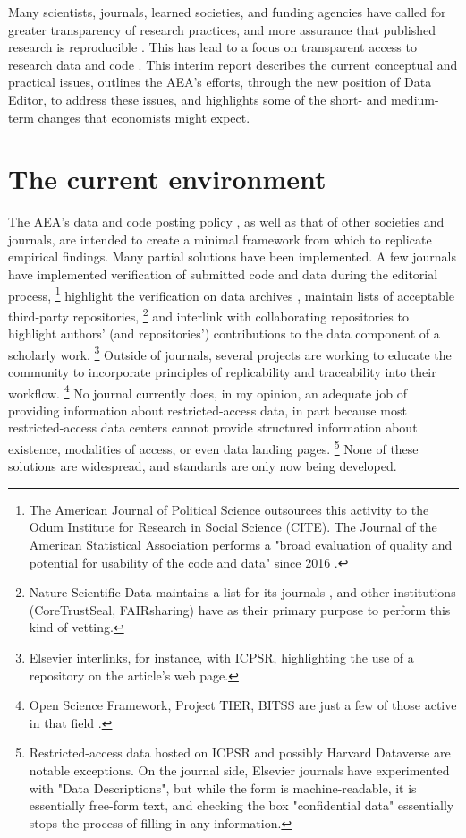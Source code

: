 \documentclass[AEJ]{AEA}
\begin{document}
Many scientists,  journals, learned societies, and funding agencies have called for greater transparency of research practices, and more assurance that published research is reproducible \citep{Stodden2016-uc,Fuentes2016-wz,Moffitt2016-wl,Camerer2016-kl,Bollen2015-vb,Joskow2015-hd}. This has lead to a focus on transparent access to research data and code \citep{Coffman2017-si,Hoeffler2017-aa,Duvendack2017-js,Hamermesh2017-kq}. This interim report describes the current conceptual and practical issues, outlines the \ac{AEA}'s efforts, through the new position of Data Editor,  to address these issues, and highlights some of the short- and medium-term changes that economists might expect. 


\section{The current environment}

The \ac{AEA}'s data and code posting policy \citep{American_Economic_Association2008-az}, as well as that of other societies and journals, are intended to create a minimal framework from which to replicate empirical findings. Many partial solutions have been implemented. A few journals have implemented verification of submitted code and data during the editorial process,%
\footnote{The American Journal of Political Science outsources this activity to the Odum Institute for Research in Social Science (CITE). The Journal of the American Statistical Association performs a "broad evaluation of quality and potential for usability of the code and data" since 2016 \citep{Stodden2016-uc}.}
highlight the verification on data archives \citep{Open_Science_Framework2017-zc}, maintain lists of acceptable third-party repositories,%
\footnote{Nature Scientific Data maintains a list for its journals \citep{Nature_Scientific_Data2016-hl}, and other institutions (CoreTrustSeal, FAIRsharing) have as their primary purpose to perform this kind of vetting.} 
and interlink with collaborating repositories to highlight authors' (and repositories') contributions to the data component of a scholarly work.%
\footnote{Elsevier interlinks, for instance, with ICPSR, highlighting the use of a repository on the article's web page.}
Outside of journals, several projects are working to educate the community to incorporate principles of replicability and traceability into their workflow.%
\footnote{Open Science Framework, Project TIER, BITSS are just a few of those active in that field \citep{Gentzkow2014-va,Wilson2016-bt}.}
No journal currently does, in my opinion, an adequate job of providing information about restricted-access data, in part because most restricted-access data centers cannot provide structured information about existence, modalities of access, or even data landing pages.%
\footnote{Restricted-access data hosted on ICPSR and possibly Harvard Dataverse are notable exceptions. On the journal side, Elsevier journals have experimented with "Data Descriptions", but while the form is machine-readable, it is essentially free-form text, and checking the box "confidential data" essentially stops the process of filling in any information.} 
None of these solutions are widespread, and standards are only now being developed.
\end{document}

